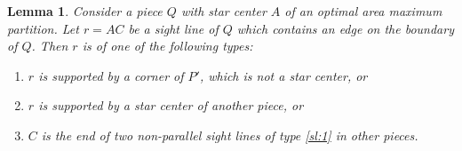 \documentclass[10pt,a4paper]{article}
\newtheorem{lemma}{Lemma}[section]
\begin{document}
\begin{lemma}\label{lem:sltypes}
Consider a piece $Q$ with star center $A$ of an optimal area maximum partition.
Let $r=AC$ be a sight line of $Q$ which contains an edge on the boundary of $Q$.
Then $r$ is of one of the following types:
\begin{enumerate}[label=(\roman*)]
\item \label{sl:1}
$r$ is supported by a corner of $P'$, which is not a star center, or

\item \label{sl:2}
$r$ is supported by a star center of another piece, or

\item \label{sl:3}
$C$ is the end of two non-parallel sight lines of type \ref{sl:1} in other pieces.
\end{enumerate}
\end{lemma}
\end{document}
